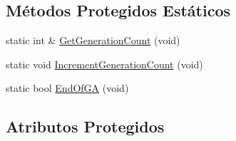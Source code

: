 \subsection*{Métodos Protegidos Estáticos}
\begin{DoxyCompactItemize}
\item 
static int \& \hyperlink{classgenetic__operator__thread_a22db2979e50888a982e4d78a874b0193}{GetGenerationCount} (void)
\item 
static void \hyperlink{classgenetic__operator__thread_a77fb097a6fa283eebe5cf6af08dd2cfc}{IncrementGenerationCount} (void)
\item 
static bool \hyperlink{classgenetic__operator__thread_aad1cfa9857458b80ca2f5ba2fa3c5d74}{EndOfGA} (void)
\end{DoxyCompactItemize}
\subsection*{Atributos Protegidos}
